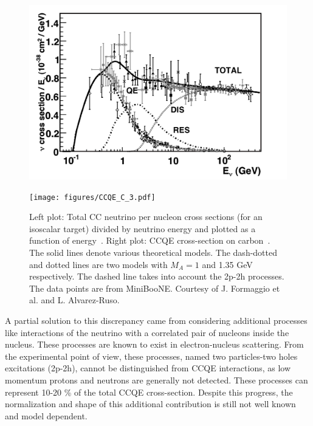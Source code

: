 \begin{figure}[htbp]
\begin{minipage}[c]{.46\linewidth}
   	      \includegraphics[width=0.9\linewidth]{figures/cc_inclusive_nu.pdf}
   \end{minipage} \hfill
   \begin{minipage}{.46\linewidth}
            \texttt{[image: figures/CCQE\_C\_3.pdf]}
   \end{minipage}
    \caption{ Left plot: Total CC neutrino per nucleon cross sections (for an isoscalar target) divided by neutrino energy and
plotted as a function of energy~\cite{formaggio}. 
Right plot: CCQE cross-section on carbon~\cite{alvarez}.
The solid
lines denote various theoretical models.  The dash-dotted and
dotted lines are two models with $M_A=1$ and 1.35 GeV respectively. 
The dashed line takes into account the 2p-2h processes.  The data points
are from MiniBooNE. Courtesy of J. Formaggio et al. and L. Alvarez-Ruso.}
 \label{fig:xsec}
\end{figure}

A partial solution to this discrepancy came from considering additional processes like interactions of the neutrino with a correlated pair of nucleons inside the nucleus. These processes are known to exist in electron-nucleus scattering. From the experimental point of view, these processes, named two particles-two holes excitations (2p-2h), cannot be distinguished from CCQE interactions, as low momentum protons and neutrons are generally not detected. These processes can represent 10-20 \% of the total CCQE cross-section. Despite this progress, the normalization and shape of this additional contribution is still not well known and model dependent.

